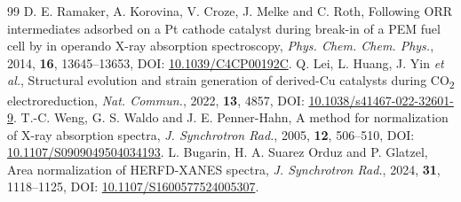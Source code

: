 \begin{thebibliography}{99}
 D. E. Ramaker, A. Korovina, V. Croze, J. Melke and C. Roth, Following ORR intermediates adsorbed on a Pt cathode catalyst during break-in of a PEM fuel cell by in operando X-ray absorption spectroscopy, \textit{Phys. Chem. Chem. Phys.}, 2014, \textbf{16}, 13645--13653, DOI: \href{https://doi.org/10.1039/C4CP00192C}{10.1039/C4CP00192C}.
 Q. Lei, L. Huang, J. Yin \textit{et al.}, Structural evolution and strain generation of derived-Cu catalysts during CO\textsubscript{2} electroreduction, \textit{Nat. Commun.}, 2022, \textbf{13}, 4857, DOI: \href{https://doi.org/10.1038/s41467-022-32601-9}{10.1038/s41467-022-32601-9}.
 T.-C. Weng, G. S. Waldo and J. E. Penner-Hahn, A method for normalization of X-ray absorption spectra, \textit{J. Synchrotron Rad.}, 2005, \textbf{12}, 506--510, DOI: \href{https://doi.org/10.1107/S0909049504034193}{10.1107/S0909049504034193}.
 L. Bugarin, H. A. Suarez Orduz and P. Glatzel, Area normalization of HERFD-XANES spectra, \textit{J. Synchrotron Rad.}, 2024, \textbf{31}, 1118--1125, DOI: \href{https://doi.org/10.1107/S1600577524005307}{10.1107/S1600577524005307}.
\end{thebibliography}
